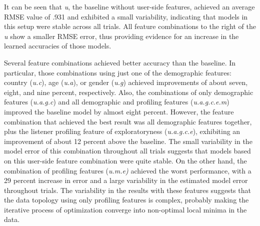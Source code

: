 It can be seen that \emph{u}, the baseline without user-side features, achieved an average RMSE value of .931 and exhibited a small variability, indicating that models in this setup were stable across all  trials. All feature combinations to the right of the \emph{u} show a smaller RMSE error, thus providing evidence for an increase in the learned accuracies of those models. 

Several feature combinations achieved better accuracy than the baseline. In particular, those combinations using just one of the demographic features: country (\emph{u.c}), age (\emph{u.a}), or gender (\emph{u.g}) achieved improvements of about seven, eight, and 
nine percent, respectively. Also, the combinations of only demographic features (\emph{u.a.g.c}) and all demographic and profiling features (\emph{u.a.g.c.e.m}) improved the baseline model by almost eight percent. However, the feature combination that achieved the best result was all demographic features together, plus the listener profiling feature of exploratoryness (\emph{u.a.g.c.e}), exhibiting an improvement of about 12 percent above the baseline. The small variability in the model error of this combination throughout all trials suggests that models based on this user-side feature combination were quite stable.
On the other hand, the combination of profiling features (\emph{u.m.e)} achieved the worst performance, with a 29 percent increase in error and a large variability in the estimated model error throughout trials. The variability in the results with these features suggests that the data topology using only profiling features is complex, probably making the iterative process of optimization converge into non-optimal local minima in the data. 



